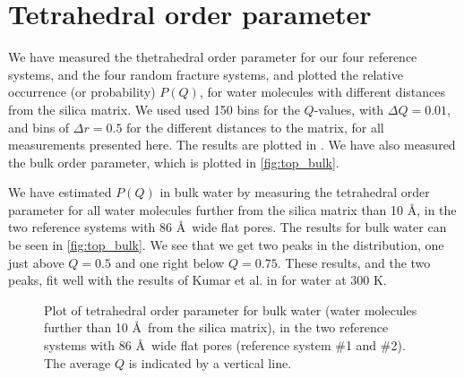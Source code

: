 \section{Tetrahedral order parameter}
%
%

We have measured the thetrahedral order parameter for our four reference systems, and the four random fracture systems, and plotted the relative occurrence (or probability) $P(Q)$, for water molecules with different distances from the silica matrix. We used used 150 bins for the $Q$-values, with $\Delta Q = 0.01$, and bins of $\Delta r = 0.5$ for the different distances to the matrix, for all measurements presented here. The results are plotted in . We have also measured the bulk order parameter, which is plotted in \cref{fig:top_bulk}.

We have estimated $P(Q)$ in bulk water by measuring the tetrahedral order parameter for all water molecules further from the silica matrix than 10 \AA, in the two reference systems with 86 \AA\ wide flat pores. The results for bulk water can be seen in \cref{fig:top_bulk}. We see that we get two peaks in the distribution, one just above $Q = 0.5$ and one right below $Q = 0.75$. These results, and the two peaks, fit well with the results of Kumar et al. in \cite{kumar2009tetrahedral} for water at 300 K.
%
\begin{figure}[!htb]%
    \centering%
    \caption{%
        Plot of tetrahedral order parameter for bulk water (water molecules further than 10 \AA\ from the silica matrix), in the two reference systems with 86 \AA\ wide flat pores (reference system \#1 and \#2). The average $Q$ is indicated by a vertical line. %
    }%
    \label{fig:top_bulk}%
    \label{fig:first_top_figure}%
\end{figure}%

